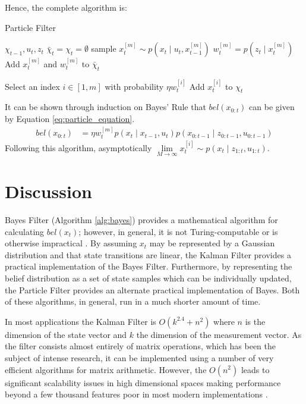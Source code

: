 \documentclass[english]{article}
\begin{document}
Hence, the complete algorithm is:
\begin{algorithm}
\caption{Particle Filter}
\label{alg:particle}
\begin{algorithmic}
	\REQUIRE $\chi_{t-1}, u_t, z_t$
        \STATE $\bar{\chi}_t = \chi_t = \emptyset$
        \STATE sample $x^{[m]}_t \sim p(x_t \mid u_t,x^{[m]}_{t-1})$
        \STATE $w^{[m]}_t = p(z_t \mid x^{[m]}_t)$
        \STATE Add $x^{[m]}_t$ and $w^{[m]}_t$ to $\bar{\chi}_t$
        \ENDFOR

        \STATE Select an index $i \in [1,m]$ with probability $\eta w^{[i]}_t$
        \STATE Add $x^{[i]}_t$ to $\chi_t$
        \ENDFOR

\end{algorithmic}
\end{algorithm}

It can be shown through induction on Bayes' Rule that $bel(x_{0:t})$ can be given by Equation \ref{eq:particle_equation}.
\begin{align}
  bel(x_{0:t}) & = \eta w^{[m]}_tp(x_t \mid x_{t-1}, u_t)p(x_{0:t-1} \mid z_{0:t-1},u_{0:t-1}) \label{eq:particle_equation}
\end{align}
Following this algorithm, asymptotically $\underset{M \to \infty}{\lim} x^{[i]}_t \sim p(x_t \mid z_{1:t}, u_{1:t})$.

\section{Discussion}

Bayes Filter (Algorithm \ref{alg:bayes}) provides a mathematical algorithm for calculating $bel(x_t)$; however, in general, it is not Turing-computable or is otherwise impractical \cite{probrob}. By assuming $x_t$ may be represented by a Gaussian distribution and that state transitions are linear, the Kalman Filter provides a practical implementation of the Bayes Filter. Furthermore, by representing the belief distribution as a set of state samples which can be individually updated, the Particle Filter provides an alternate practical implementation of Bayes. Both of these algorithms, in general, run in a much shorter amount of time.

In most applications the Kalman Filter is $O(k^{2.4} + n^2)$ where $n$ is the dimension of the state vector and $k$ the dimension of the measurement vector\cite{probrob}. As the filter consists almost entirely of matrix operations, which has been the subject of intense research, it can be implemented using a number of very efficient algorithms for matrix arithmetic. However, the $O(n^2)$ leads to significant scalability issues in high dimensional spaces making performance beyond a few thousand features poor in most modern implementations \cite{Thrun02d}.
\end{document}
